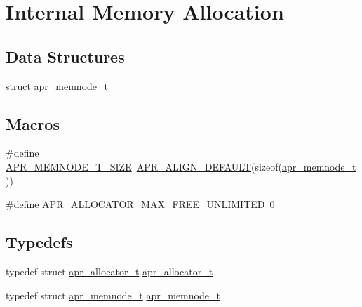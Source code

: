 \hypertarget{group__apr__allocator}{\section{Internal Memory Allocation}
\label{group__apr__allocator}
}
\subsection*{Data Structures}
\begin{DoxyCompactItemize}
\item 
struct \hyperlink{structapr__memnode__t}{apr\-\_\-memnode\-\_\-t}
\end{DoxyCompactItemize}
\subsection*{Macros}
\begin{DoxyCompactItemize}
\item 
\#define \hyperlink{group__apr__allocator_gaf382851817012929f4e2458b43f4482c}{A\-P\-R\-\_\-\-M\-E\-M\-N\-O\-D\-E\-\_\-\-T\-\_\-\-S\-I\-Z\-E}~\hyperlink{group__apr__general_gab484e98426221f3212fcb67af0467381}{A\-P\-R\-\_\-\-A\-L\-I\-G\-N\-\_\-\-D\-E\-F\-A\-U\-L\-T}(sizeof(\hyperlink{structapr__memnode__t}{apr\-\_\-memnode\-\_\-t}))
\item 
\#define \hyperlink{group__apr__allocator_ga54f32b19d8dad59bc6364a7a6b8ebec9}{A\-P\-R\-\_\-\-A\-L\-L\-O\-C\-A\-T\-O\-R\-\_\-\-M\-A\-X\-\_\-\-F\-R\-E\-E\-\_\-\-U\-N\-L\-I\-M\-I\-T\-E\-D}~0
\end{DoxyCompactItemize}
\subsection*{Typedefs}
\begin{DoxyCompactItemize}
\item 
typedef struct \hyperlink{group__apr__allocator_ga1ceabfd30fcfc455e47d052d2a24244b}{apr\-\_\-allocator\-\_\-t} \hyperlink{group__apr__allocator_ga1ceabfd30fcfc455e47d052d2a24244b}{apr\-\_\-allocator\-\_\-t}
\item 
typedef struct \hyperlink{structapr__memnode__t}{apr\-\_\-memnode\-\_\-t} \hyperlink{group__apr__allocator_ga3b6437036dfcdffbf87ad4677c818211}{apr\-\_\-memnode\-\_\-t}
\end{DoxyCompactItemize}

